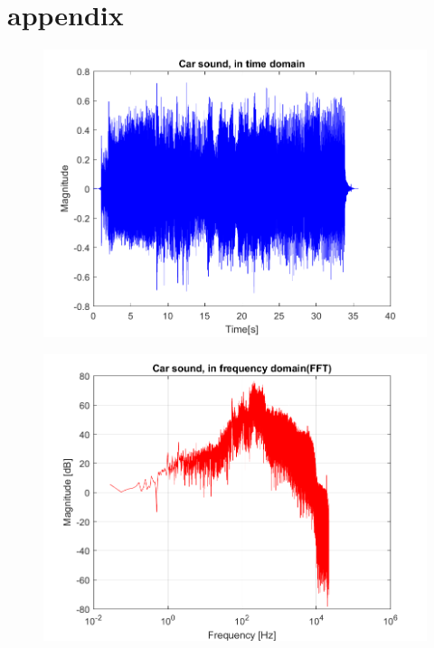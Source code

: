 \section{appendix}

\begin{figure}
	\centering
	\includegraphics[width=\textwidth]{code/Car_figure1.png}
	\caption{}
	\label{fig:Car_figure1:2}
\end{figure}


\begin{figure}
	\centering
	\includegraphics[width=\textwidth]{code/Car_figure2.png}
	\caption{}
	\label{fig:Car_figure2:2}
\end{figure}



